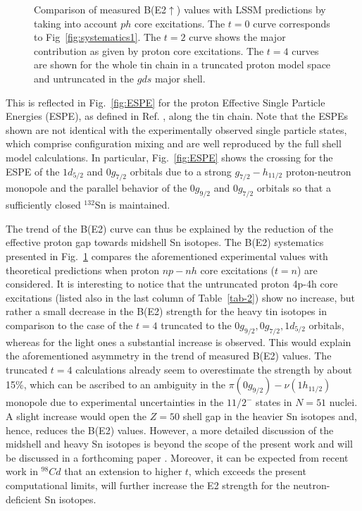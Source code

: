 \documentclass[prc,twocolumn,amssymb,amsmath,showpacs,superscriptaddress]{revtex4}
\begin{document}
\begin{figure}[!t]\hspace{0.0cm}
\centering\mbox{}
\vspace{-10pt}\caption{\small Comparison of measured
B(E2$\uparrow$) values with LSSM predictions by taking into
account $ph$ core excitations. The $t=0$ curve corresponds to
Fig~\ref{fig:systematics1}. The $t=2$ curve shows the major
contribution as given by proton core excitations. The $t=4$ curves
are shown for the whole tin chain in a truncated proton model
space and untruncated in the $gds$ major
shell.}\label{fig:systematics2}
\end{figure}
This is reflected in Fig.~\ref{fig:ESPE} for the proton Effective
Single Particle Energies (ESPE), as defined in Ref. \cite{ots01},
along the tin chain. Note that the ESPEs shown are not identical
with the experimentally observed single particle states, which
comprise configuration mixing and are well reproduced by the full
shell model calculations. In particular, Fig.~\ref{fig:ESPE} shows
the crossing for the ESPE of the $1d_{5/2}$ and $0g_{7/2}$
orbitals due to a strong $g_{7/2} - h_{11/2}$ proton-neutron
monopole and the parallel behavior of the $0g_{9/2}$ and
$0g_{7/2}$ orbitals so that a sufficiently closed $^{132}$Sn is
maintained.

The trend of the B(E2) curve can thus be explained by the
reduction of the effective proton gap towards midshell Sn
isotopes. The B(E2) systematics presented in
Fig.~\ref{fig:systematics2} compares the aforementioned
experimental values \cite{ban05, ram01, rad04} with theoretical
predictions when proton $np-nh$ core excitations ($t=n$) are
considered. It is interesting to notice that the untruncated
proton 4p-4h core excitations (listed also in the last column of
Table~\ref{tab-2}) show no increase, but rather a small decrease
in the B(E2) strength for the heavy tin isotopes in comparison to
the case of the $t=4$ truncated to the
$0g_{9/2},0g_{7/2},1d_{5/2}$ orbitals, whereas for the light ones
a substantial increase is observed. This would explain the
aforementioned asymmetry in the trend of measured B(E2) values.
The truncated $t=4$ calculations already seem to overestimate the
strength by about 15\%, which can be ascribed to an ambiguity in
the $\pi (0g_{9/2}) - \nu (1h_{11/2})$ monopole due to
experimental uncertainties in the $11/2^-$ states in $N=51$
nuclei. A slight increase would open the $Z=50$ shell gap in the
heavier Sn isotopes and, hence, reduces the B(E2) values. However,
a more detailed discussion of the midshell and heavy Sn isotopes
is beyond the scope of the present work and will be discussed in a
forthcoming paper \cite{gni05}. Moreover, it can be expected from
recent work in $^{98}Cd$ \cite{bla04} that an extension to higher
$t$, which exceeds the present computational limits,
will further increase the E2 strength for the neutron-deficient Sn isotopes.\\
\end{document}
